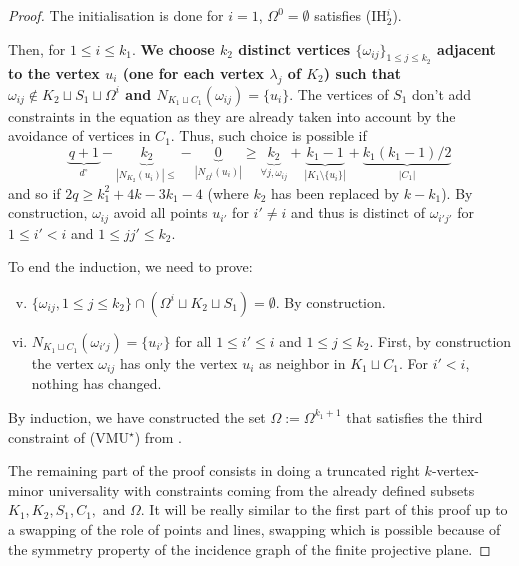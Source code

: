 \documentclass[10pt,a4paper]{article}
\newcommand{\ls}{\leqslant}
\newcommand{\gs}{\geqslant}
\begin{document}
\begin{proof}
        The initialisation is done for $i=1$, $\Omega^{0} = \emptyset$ satisfies (IH$_2^{i}$). 
        
        Then, for $1 \ls i \ls k_1$. \textbf{We choose $k_2$ distinct vertices $\{\omega_{ij}\}_{1 \ls j \ls k_2}$ adjacent to the vertex $u_i$ (one for each vertex $\lambda_j$ of $K_2$) such that  $\omega_{ij} \notin K_2 \sqcup S_1 \sqcup \Omega^i$ and $N_{K_1 \sqcup C_1}(\omega_{ij}) = \{u_i\}$}. The vertices of $S_1$ don't add constraints in the equation as they are already taken into account by the avoidance of vertices in $C_1$. Thus, such choice is possible if
        $$\underbrace{q+1}_{d^\circ} - \underbrace{k_2}_{|N_{K_2}(u_i)|\ls} - \underbrace{0}_{|N_{\Omega^i}(u_i)|} \gs \underbrace{k_2}_{\forall j, \omega_{ij}} + \underbrace{k_1 - 1}_{|K_1 \setminus \{u_i\}|} + \underbrace{k_1(k_1-1)/2}_{|C_1|}$$ 
        and so if $2q \gs k_1^2+4k-3k_1-4$ (where $k_2$ has been replaced by $k-k_1$). By construction, $\omega_{ij}$ avoid all points $u_{i'}$ for $i' \neq i$ and thus is distinct of $\omega_{i'j'}$ for $1 \ls i' < i$ and $1 \ls j j' \ls k_2$.
        
        To end the induction, we need to prove:
        \begin{enumerate}[(i)]
            \setcounter{enumi}{4}
            \item $ \{\omega_{ij}, 1\ls j \ls k_2\} \cap (\Omega^i \sqcup K_2 \sqcup S_1) = \emptyset$. By construction.
            \item $N_{K_1 \sqcup C_1}(\omega_{i'j}) = \{u_{i'}\}$ for all $1 \ls i' \ls i$ and $1 \ls j \ls k_2$. First, by construction the vertex $\omega_{ij}$ has only the vertex $u_i$ as neighbor in $K_1 \sqcup C_1$. For $i' < i$, nothing has changed. 
        \end{enumerate}
        
        By induction, we have constructed the set $\Omega := \Omega^{k_1+1}$ that satisfies the third constraint of (VMU$^\star$) from .
        
        \bigskip The remaining part of the proof consists in doing a truncated right $k$-vertex-minor universality with constraints coming from the already defined subsets $K_1, K_2, S_1, C_1, $ and $\Omega$. It will be really similar to the first part of this proof up to a swapping of the role of points and lines, swapping which is possible because of the symmetry property of the incidence graph of the finite projective plane. 


\end{proof}
\end{document}
